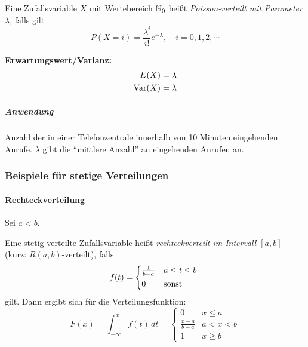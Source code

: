                     Eine Zufallsvariable \(X\) mit Wertebereich \( \mathbb{N}_0 \) heißt \textit{Poisson-verteilt mit Parameter \( \lambda \)}, falls gilt
                    \begin{equation*}
                        P(X = i) = \frac{\lambda^i}{i!} e^{-\lambda}, \quad i = 0, 1, 2, \cdots
                    \end{equation*}
                    
                    \textbf{Erwartungswert/Varianz:}
                    \begin{align*}
                    	E(X)    & = \lambda \\
                    	\operatorname{Var}(X) & = \lambda
                    \end{align*}
                    
                    \subparagraph{Anwendung}
                        Anzahl der in einer Telefonzentrale innerhalb von 10 Minuten eingehenden Anrufe. \(\lambda\) gibt die \enquote{mittlere Anzahl} an eingehenden Anrufen an.

            \subsubsection{Beispiele für stetige Verteilungen}
                \paragraph{Rechteckverteilung}
                    Sei \( a < b \).
                    
                    Eine stetig verteilte Zufallsvariable heißt \textit{rechteckverteilt im Intervall \( [a, b] \)} (kurz: \( R(a, b) \)-verteilt), falls
                    \begin{equation*}
                        f(t) =
                        \begin{cases*}
	                        \frac{1}{b - a} & \(a \leq t \leq b\) \\
	                        0               & \textrm{sonst}
                        \end{cases*}
                    \end{equation*}
                    gilt. Dann ergibt sich für die Verteilungsfunktion:
                    \begin{equation*}
                        F(x) = \int_{-\infty}^{x} \! f(t) \, dt =
                        \begin{cases}
                        	0                   & x \leq a  \\
                        	\frac{x - a}{b - a} & a < x < b \\
                        	1                   & x \geq b
                        \end{cases}
                    \end{equation*}

